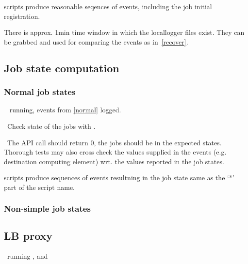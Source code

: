 \begin{hints}
 scripts produce reasonable seqences of events, including
the job initial registration.

There is approx. 1min time window in which the locallogger files exist.
They can be grabbed and used for comparing the events as in~\ref{recover}.

\end{hints}



\subsection{Job state computation}

\subsubsection{Normal job states}
\label{state}
\req\  running, events from \ref{normal} logged.

\how\ Check state of the jobs with .

\result\ The API call should return 0, the jobs should be in the expected
states. Thorough tests may also cross check the values supplied in the
events (e.g. destination computing element) wrt. the values reported in the job states.

\begin{hints}
 scripts produce sequences of events resultning
in the job state same as the `*' part of the script name.
\end{hints}

\subsubsection{Non-simple job states}



\subsection{LB proxy}
\req\ running ,  and


